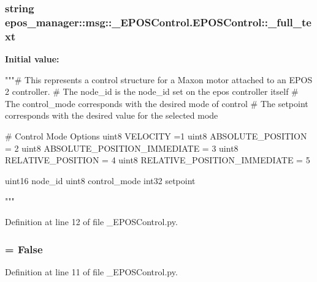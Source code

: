 \subsubsection[{\-\_\-full\-\_\-text}]{\setlength{\rightskip}{0pt plus 5cm}string {\bf epos\-\_\-manager\-::msg\-::\-\_\-\-E\-P\-O\-S\-Control.\-E\-P\-O\-S\-Control\-::\-\_\-full\-\_\-text}\hspace{0.3cm}{\ttfamily  [static, private]}}\label{classepos__manager_1_1msg_1_1__EPOSControl_1_1EPOSControl_ad749e9b205010ae339b6c6e89790724e}
{\bfseries \-Initial value\-:}
\begin{DoxyCode}
"""# This represents a control structure for a Maxon motor attached to an EPOS
       2 controller.  
# The node_id is the node_id set on the epos controller itself
# The control_mode corresponds with the desired mode of control
# The setpoint corresponds with the desired value for the selected mode

# Control Mode Options
uint8 VELOCITY =1
uint8 ABSOLUTE_POSITION = 2
uint8 ABSOLUTE_POSITION_IMMEDIATE = 3
uint8 RELATIVE_POSITION = 4
uint8 RELATIVE_POSITION_IMMEDIATE = 5


uint16 node_id
uint8 control_mode
int32 setpoint





"""
\end{DoxyCode}


\-Definition at line 12 of file \-\_\-\-E\-P\-O\-S\-Control.\-py.

\subsubsection[{\-\_\-has\-\_\-header}]{ = \-False\hspace{0.3cm}{\ttfamily  [static, private]}}\label{classepos__manager_1_1msg_1_1__EPOSControl_1_1EPOSControl_a358311b9ccbbdeba9c7dd132070f2f0c}


\-Definition at line 11 of file \-\_\-\-E\-P\-O\-S\-Control.\-py.

